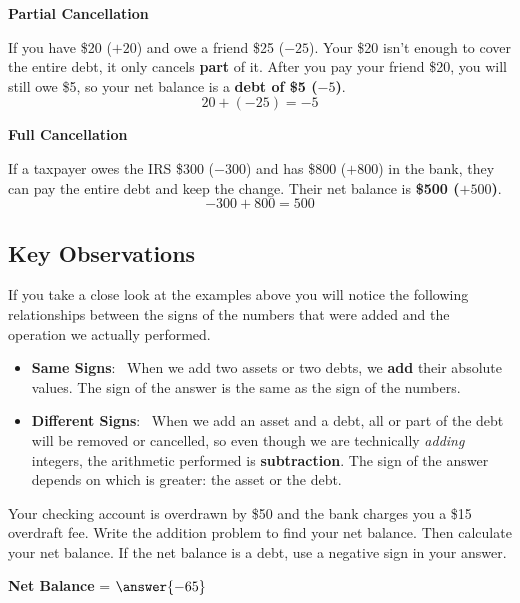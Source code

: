\documentclass{ximera}[font=12pt]
\begin{document}
\begin{example} \textcolor{glaucous}{\textbf{Partial Cancellation}}  
    
    If you have \$20 ($+20$) and owe a friend \$25 ($-25$).  Your \$20 isn't enough to 
    cover the entire debt, it only cancels \textbf{part} of it.  After you pay your friend \$20, you will still owe \$5, so
    your net balance is a \textbf{debt of \$5 ($-5$)}.
    \[ 20 + (-25) = -5 \]
\end{example}

\begin{example} \textcolor{glaucous}{\textbf{Full Cancellation}} 
    
    If a taxpayer owes the IRS \$300 ($-300$) and has \$800 ($+800$) in the bank, they can pay the 
    entire debt and keep the change.  Their net balance is \textbf{\$500 ($+500$)}.
    \[ -300 + 800 = 500 \]
\end{example}


\subsection*{Key Observations}

If you take a close look at the examples above you will notice the following relationships between the signs of the numbers that were added and the 
operation we actually performed.


\begin{itemize}
    \item[] \textbf{Same Signs}: \ When we add two assets or two debts, we \textbf{add} their absolute values.  The sign of 
    the answer is the same as the sign of the numbers.

    \item[] \textbf{Different Signs}: \  When we add an asset and a debt, all or part of the debt will be removed or cancelled, 
    so even though we are technically \emph{adding} integers, the arithmetic performed is \textbf{subtraction}.  The sign of 
    the answer depends on which is greater: the asset or the debt.
\end{itemize}



\begin{problem}
Your checking account is overdrawn by \$50 and the bank charges you a \$15 overdraft fee.  Write the addition problem to find your 
net balance.  Then calculate your net balance.  If the net balance is a debt, use a negative sign in your answer. 


\begin{multipleChoice}
\end{multipleChoice}


\textcolor{orange!75!black}{\textbf{Net Balance}} = $\answer{-65}$

\end{problem}
\end{document}
